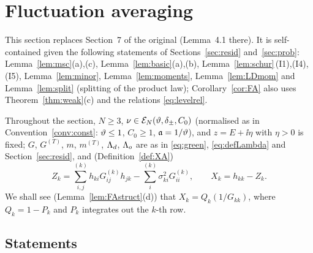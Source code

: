\section{Fluctuation averaging}\label{sec:FA}
This section replaces Section~7 of the original (Lemma~4.1 there). It is self-contained given the following statements of
Sections~\ref{sec:resid} and~\ref{sec:prob}: Lemma~\ref{lem:msc}(a),(c), Lemma~\ref{lem:basic}(a),(b), Lemma~\ref{lem:schur}\,(I1),(I4),(I5), Lemma~\ref{lem:minor},
Lemma~\ref{lem:moments}, Lemma~\ref{lem:LDmom} and Lemma~\ref{lem:split} (splitting of the product law); Corollary~\ref{cor:FA} also uses
Theorem~\ref{thm:weak}(c) and the relations \eqref{eq:levelrel}.

Throughout the section, $N\ge3$, $\nu\in\mathcal E_N(\vartheta,\delta_\pm,C_0)$ (normalised as in Convention~\ref{conv:const}: $\vartheta\le1$, $C_0\ge1$, $\mathfrak{a}=1/\vartheta$), and
$z=E+\ii\eta$ with $\eta>0$ is fixed; $G$, $G^{(T)}$, $m$, $m^{(T)}$, $\Lambda_d$, $\Lambda_o$ are as in \eqref{eq:green}, \eqref{eq:defLambda} and Section~\ref{sec:resid},
and (Definition~\ref{def:XA})
\[
 Z_k=\sum^{(k)}_{i,j}h_{ki}G^{(k)}_{ij}h_{jk}-\sum^{(k)}_i\sigma_{ki}^2G^{(k)}_{ii},\qquad X_k=h_{kk}-Z_k .
\]
We shall see (Lemma~\ref{lem:FAstruct}(d)) that $X_k=Q_k(1/G_{kk})$, where $Q_k=1-P_k$ and $P_k$ integrates out the $k$-th row.

\subsection{Statements}

